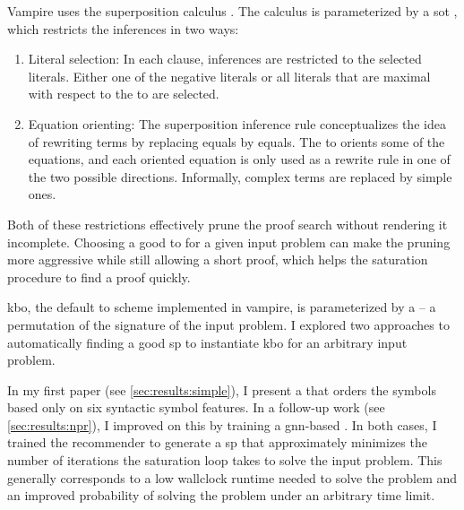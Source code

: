 Vampire uses the superposition calculus \cite{DBLP:journals/logcom/BachmairG94}.
The calculus is parameterized by a \gls{sot} \cite{DBLP:conf/cav/KovacsV13},
which restricts the inferences in two ways:
\begin{enumerate}
\item Literal selection: In each clause, inferences are restricted to the selected literals.
Either one of the negative literals
or all literals that are maximal with respect to the \gls{to} are selected.
\item Equation orienting: The superposition inference rule conceptualizes the idea of rewriting terms by replacing equals by equals.
The \gls{to} orients some of the equations, and each oriented equation is only used as a rewrite rule in one of the two possible directions.
Informally, complex terms are replaced by simple ones.
\end{enumerate}
Both of these restrictions effectively prune the proof search without rendering it incomplete.
Choosing a good \gls{to} for a given input problem
can make the pruning more aggressive while still allowing a short proof,
which helps the saturation procedure to find a proof quickly.

\Gls{kbo}, the default \gls{to} scheme implemented in \gls{vampire}, is parameterized by a  -- a permutation of the \gls{signature} of the input problem.
I explored two approaches to automatically finding a good \gls{sp} to instantiate \gls{kbo} for an arbitrary input problem.

In my first paper \cite{DBLP:conf/cade/Bartek020} (see \cref{sec:results:simple}),
I present a  that orders the symbols based only on six syntactic symbol features.
In a follow-up work \cite{DBLP:conf/cade/Bartek021} (see \cref{sec:results:npr}),
I improved on this by training a \acrshort{gnn}-based .
In both cases, I trained the recommender to generate a \gls{sp} that
approximately minimizes the number of iterations the saturation loop takes to solve the input problem.
This generally corresponds to
a low \gls{wallclock} \gls{runtime} needed to solve the problem and
an improved probability of solving the problem under an arbitrary time limit.

